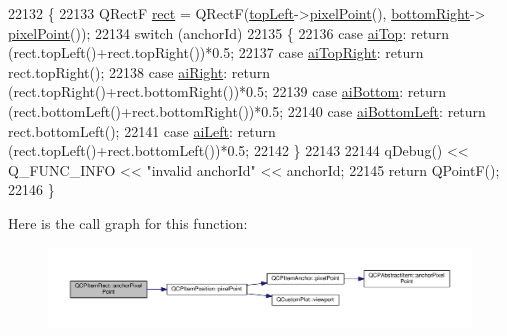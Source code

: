 \begin{DoxyCode}
22132 \{
22133   QRectF \hyperlink{_gen_blob_8m_aea8f6815d9a63491fc422c5572c6b3c3}{rect} = QRectF(\hyperlink{class_q_c_p_item_rect_aa70feeef173489b03c3fbe906a5023c4}{topLeft}->\hyperlink{class_q_c_p_item_position_ae490f9c76ee2ba33752c495d3b6e8fb5}{pixelPoint}(), \hyperlink{class_q_c_p_item_rect_a409f3bfe615a7e322bb3d4d193d85b26}{bottomRight}->
      \hyperlink{class_q_c_p_item_position_ae490f9c76ee2ba33752c495d3b6e8fb5}{pixelPoint}());
22134   \textcolor{keywordflow}{switch} (anchorId)
22135   \{
22136     \textcolor{keywordflow}{case} \hyperlink{class_q_c_p_item_rect_af0ebba58e6bca4851c4db726691ec0d3acaef33243034885d551dc9b8318ad326}{aiTop}:         \textcolor{keywordflow}{return} (rect.topLeft()+rect.topRight())*0.5;
22137     \textcolor{keywordflow}{case} \hyperlink{class_q_c_p_item_rect_af0ebba58e6bca4851c4db726691ec0d3aa94843ce5935b36994005c1e1859ef60}{aiTopRight}:    \textcolor{keywordflow}{return} rect.topRight();
22138     \textcolor{keywordflow}{case} \hyperlink{class_q_c_p_item_rect_af0ebba58e6bca4851c4db726691ec0d3a69fa21fde2f44036381296a6f78b4eb4}{aiRight}:       \textcolor{keywordflow}{return} (rect.topRight()+rect.bottomRight())*0.5;
22139     \textcolor{keywordflow}{case} \hyperlink{class_q_c_p_item_rect_af0ebba58e6bca4851c4db726691ec0d3a2d294551e07179c4ac0c4e37364a1468}{aiBottom}:      \textcolor{keywordflow}{return} (rect.bottomLeft()+rect.bottomRight())*0.5;
22140     \textcolor{keywordflow}{case} \hyperlink{class_q_c_p_item_rect_af0ebba58e6bca4851c4db726691ec0d3ab3c42dbb1709a04ba9b03dcbf5a2537a}{aiBottomLeft}:  \textcolor{keywordflow}{return} rect.bottomLeft();
22141     \textcolor{keywordflow}{case} \hyperlink{class_q_c_p_item_rect_af0ebba58e6bca4851c4db726691ec0d3a8a095c6d6b2e7665a15d9f40c94b47dc}{aiLeft}:        \textcolor{keywordflow}{return} (rect.topLeft()+rect.bottomLeft())*0.5;
22142   \}
22143   
22144   qDebug() << Q\_FUNC\_INFO << \textcolor{stringliteral}{"invalid anchorId"} << anchorId;
22145   \textcolor{keywordflow}{return} QPointF();
22146 \}
\end{DoxyCode}


Here is the call graph for this function\+:\nopagebreak
\begin{figure}[H]
\begin{center}
\leavevmode
\includegraphics[width=350pt]{class_q_c_p_item_rect_ae0973f8281fb52361b0c99ee899be07e_cgraph}
\end{center}
\end{figure}


